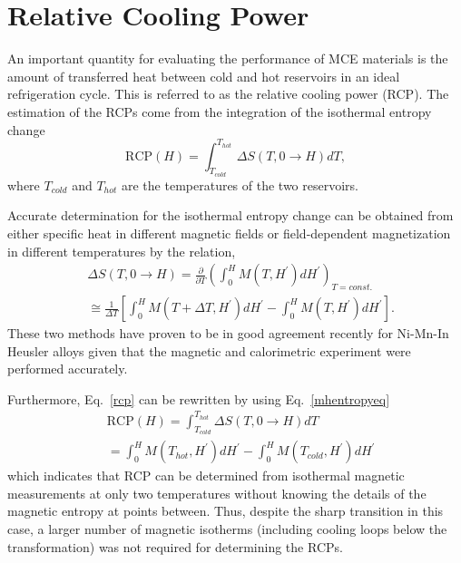 \documentclass[sort&compress,twocolumn,3p]{elsarticle}
\begin{document}
\section{Relative Cooling Power}
An important quantity for evaluating the performance of MCE materials is the amount of transferred heat
between cold and hot reservoirs in an ideal refrigeration cycle\cite{:/content/aip/journal/jap/90/9/10.1063/1.1405836,gschneidner1999recent}.
This is referred to as the relative cooling power (RCP).
The estimation of the RCPs come from the integration of the isothermal entropy change
\begin{equation}
\text{RCP}(H)=\int_{T_{cold}}^{T_{hot}}\Delta S(T, 0\to H)dT,
\label{rcp}
\end{equation}
where $T_{cold}$ and $T_{hot}$ are the temperatures of the two reservoirs.

Accurate determination for the isothermal entropy change can be obtained 
from either specific heat in different magnetic fields\cite{PhysRevB.77.214439}
or field-dependent magnetization in different temperatures by the relation\cite{PhysRevB.64.144406,Amaral20101552},
\begin{equation}
\begin{split}
&\Delta S(T, 0\to H)=\frac{\partial}{\partial T}\left(\int_0^H M(T,H^\prime)dH^\prime\right)_{T=const.}\\
&\cong\frac{1}{\Delta T}\left[\int_0^HM(T+\Delta T,H^\prime)dH^\prime-\int_0^HM(T,H^\prime)dH^\prime\right].
\end{split}
\label{mhentropyeq}
\end{equation}
These two methods have proven to be in good agreement recently for Ni-Mn-In Heusler alloys
given that the magnetic and calorimetric experiment were performed accurately\cite{0022-3727-45-25-255001,:/content/aip/journal/jap/116/20/10.1063/1.4902527}.

Furthermore, Eq.~\ref{rcp} can be rewritten\cite{Amaral20101552} by using Eq.~\ref{mhentropyeq}
\begin{equation}
\begin{split}
&\text{RCP}(H)=\int_{T_{cold}}^{T_{hot}}\Delta S(T, 0\to H)dT\\
&=\int_0^H M(T_{hot},H^\prime) dH^\prime-\int_0^H M(T_{cold},H^\prime) dH^\prime
\end{split}
\label{rcpmh}
\end{equation}
which indicates that RCP can be determined from isothermal magnetic measurements at only two temperatures without knowing the details of the magnetic entropy at points between.
Thus, despite the sharp transition in this case, a larger number of magnetic isotherms (including cooling loops below the transformation) was not required for determining the RCPs.
\end{document}
